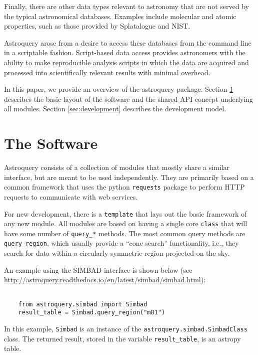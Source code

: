 \documentclass{article}
\begin{document}
Finally, there are other data types relevant to astronomy that are not
served by the typical astronomical databases.  Examples include molecular
and atomic properties, such as those provided by Splatalogue and NIST.

Astroquery arose from a desire to access these databases from the command line
in a scriptable fashion.  Script-based data access provides astronomers with
the ability to make reproducible analysis scripts in which the data are
acquired and processed into scientifically relevant results with minimal
overhead.

In this paper, we provide an overview of the astroquery package.
Section \ref{sec:software} describes the basic layout of the software and
the shared API concept underlying all modules.  Section \ref{sec:development}
describes the development model.



\section{The Software}
\label{sec:software}
Astroquery consists of a collection of modules that mostly share a similar interface,
but are meant to be used independently.  They are primarily based on a common framework
that uses the python \texttt{requests} package to perform HTTP requests to communicate
with web services.

For new development, there is a \texttt{template}  that lays out the basic
framework of any new module.  All modules are based on having a single core
\texttt{class} that will have some number of \texttt{query\_*} methods.
The most common query methods are \texttt{query\_region}, which usually provide
a ``cone search'' functionality, i.e., they search for data within a circularly
symmetric region projected on the sky.

An example using the SIMBAD interface is shown below (see
\url{http://astroquery.readthedocs.io/en/latest/simbad/simbad.html}):
\begin{lstlisting}

    from astroquery.simbad import Simbad
    result_table = Simbad.query_region("m81")

\end{lstlisting}
In this example, \texttt{Simbad} is an instance of the
\texttt{astroquery.simbad.SimbadClass} class.
The returned result, stored in the variable \texttt{result\_table},
is an astropy table.
\end{document}
